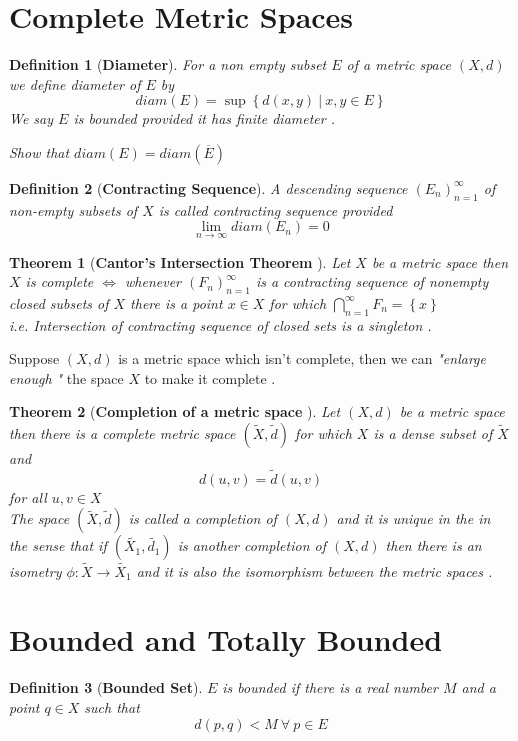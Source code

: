\documentclass{article}
\newcommand{\set}[1]{\left\{#1\right\}}
\newtheorem{theorem}{Theorem}[section]
\newtheorem{defn}{Definition}[section]
\begin{document}
\section{Complete Metric Spaces}
 \begin{defn}[\textbf{Diameter}]
	For a non empty subset $E$ of a metric space $(X,d)$ we define diameter of $E$ by \[diam(E)=\sup\set{d(x,y) \ | \ x,y\in E}\]
	We say $E$ is bounded provided it has finite diameter . 	\\
	\begin{center}
		Show that $diam(E)=diam(\overline{E})$
	\end{center}
 \end{defn}

\begin{defn}[\textbf{Contracting Sequence}]
	A descending sequence $(E_n)_{n=1}^{\infty}$ of non-empty subsets of $X$ is called contracting sequence provided \[\lim\limits_{n\to \infty}diam(E_n)=0\] 
\end{defn}
\begin{theorem} [\textbf{Cantor's Intersection Theorem }]
	Let $X$ be a metric space then \\
	$X$ is complete $\iff$ whenever $(F_n)_{n=1}^{\infty}$ is a contracting sequence of nonempty closed subsets of $X$ there is a point $x\in X$ for which $\bigcap_{n=1}^{\infty}F_n = \set{x}$ \\
	i.e. Intersection of contracting sequence of closed sets is a singleton .
\end{theorem}
Suppose $(X,d)$ is a metric space which isn't complete, then we can \textit{"enlarge enough "} the space $X$ to make it complete .
\begin{theorem}[\textbf{Completion of a metric space} ] Let $(X,d)$ be a metric space then there is a complete metric space $(\tilde{X},\tilde{d})$ for which $X$ is a dense subset of $\tilde{X}$ and \[d(u,v) = \tilde{d}(u,v)\] for all $u,v\in X$\\
	The space $(\tilde{X},\tilde{d})$ is called a completion of $(X,d)$ and it is unique in the in the sense that if  $(\tilde{X_1},\tilde{d_1})$ is another completion of $(X,d)$ then there is an isometry $\phi : \tilde{X}\to \tilde{X_1}$ and it is also the isomorphism between the metric spaces .
\end{theorem}
\section{Bounded and Totally Bounded }
\begin{defn}
	 [\textbf{Bounded Set}] $E$ is bounded if there is a real number  $M$ and a point $q \in X$ such that \[d(p,q) < M  \ \forall \ p \in E\]
\end{defn}
\end{document}
